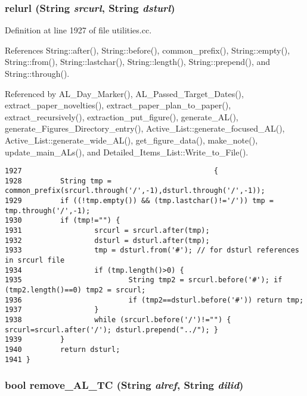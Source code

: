 \subsubsection{ relurl ({\bf String} {\em srcurl}, {\bf String} {\em dsturl})}\label{dil2al_8hh_a228}




Definition at line 1927 of file utilities.cc.

References String::after(), String::before(), common\_\-prefix(), String::empty(), String::from(), String::lastchar(), String::length(), String::prepend(), and String::through().

Referenced by AL\_\-Day\_\-Marker(), AL\_\-Passed\_\-Target\_\-Dates(), extract\_\-paper\_\-novelties(), extract\_\-paper\_\-plan\_\-to\_\-paper(), extract\_\-recursively(), extraction\_\-put\_\-figure(), generate\_\-AL(), generate\_\-Figures\_\-Directory\_\-entry(), Active\_\-List::generate\_\-focused\_\-AL(), Active\_\-List::generate\_\-wide\_\-AL(), get\_\-figure\_\-data(), make\_\-note(), update\_\-main\_\-ALs(), and Detailed\_\-Items\_\-List::Write\_\-to\_\-File().



\footnotesize\begin{verbatim}1927                                             {
1928         String tmp = common_prefix(srcurl.through('/',-1),dsturl.through('/',-1));
1929         if ((!tmp.empty()) && (tmp.lastchar()!='/')) tmp = tmp.through('/',-1);
1930         if (tmp!="") {
1931                 srcurl = srcurl.after(tmp);
1932                 dsturl = dsturl.after(tmp);
1933                 tmp = dsturl.from('#'); // for dsturl references in srcurl file
1934                 if (tmp.length()>0) {
1935                         String tmp2 = srcurl.before('#'); if (tmp2.length()==0) tmp2 = srcurl;
1936                         if (tmp2==dsturl.before('#')) return tmp;
1937                 }
1938                 while (srcurl.before('/')!="") { srcurl=srcurl.after('/'); dsturl.prepend("../"); }
1939         }
1940         return dsturl;
1941 }
\end{verbatim}\normalsize 
{}
\subsubsection{\setlength{\rightskip}{0pt plus 5cm}bool remove\_\-AL\_\-TC ({\bf String} {\em alref}, {\bf String} {\em dilid})}\label{dil2al_8hh_a294}




